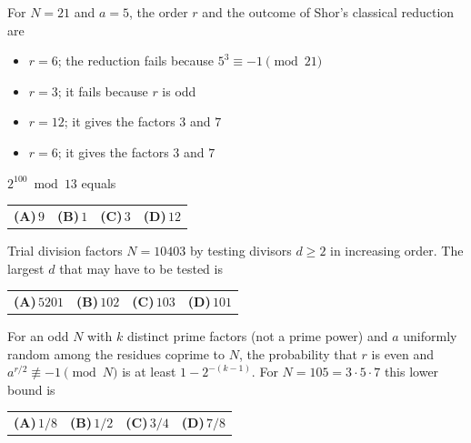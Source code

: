 \documentclass[11pt,a4paper]{article}
\newcommand{\optlabel}[1]{\textbf{(#1)}}
\newenvironment{qitem}[1]{\begin{list}{}{\setlength{\leftmargin}{3.3em}\setlength{\labelwidth}{3.1em}%
  \setlength{\labelsep}{0.2em}\setlength{\topsep}{3pt}\setlength{\parsep}{3pt}}\item[\textbf{Q.#1}\hfill]}{\end{list}}
\newcommand{\qsep}{\par\vspace{2pt}{\color{black!15}\hrule}\vspace{4pt}}
\begin{document}
\begin{qitem}{11}
For $N = 21$ and $a = 5$, the order $r$ and the outcome of Shor's classical reduction are
\begin{itemize}[leftmargin=2.6em, labelsep=0.4em, itemsep=2pt, topsep=3pt]
\item[\optlabel{A}] $r = 6$; the reduction fails because $5^3 \equiv -1 \pmod{21}$
\item[\optlabel{B}] $r = 3$; it fails because $r$ is odd
\item[\optlabel{C}] $r = 12$; it gives the factors $3$ and $7$
\item[\optlabel{D}] $r = 6$; it gives the factors $3$ and $7$
\end{itemize}
\end{qitem}
\qsep

\begin{qitem}{12}
$2^{100} \bmod 13$ equals
\par\smallskip\noindent\begin{tabularx}{\linewidth}{@{}*{4}{L}@{}}
\optlabel{A}\,$9$ & \optlabel{B}\,$1$ & \optlabel{C}\,$3$ & \optlabel{D}\,$12$
\end{tabularx}
\end{qitem}
\qsep

\begin{qitem}{13}
Trial division factors $N = 10403$ by testing divisors $d \ge 2$ in increasing order. The largest $d$ that may have to be tested is
\par\smallskip\noindent\begin{tabularx}{\linewidth}{@{}*{4}{L}@{}}
\optlabel{A}\,$5201$ & \optlabel{B}\,$102$ & \optlabel{C}\,$103$ & \optlabel{D}\,$101$
\end{tabularx}
\end{qitem}
\qsep

\begin{qitem}{14}
For an odd $N$ with $k$ distinct prime factors (not a prime power) and $a$ uniformly random among the residues coprime to $N$, the probability
that $r$ is even and $a^{r/2} \not\equiv -1 \pmod N$ is at least $1 - 2^{-(k-1)}$. For $N = 105 = 3\cdot5\cdot7$ this lower bound is
\par\smallskip\noindent\begin{tabularx}{\linewidth}{@{}*{4}{L}@{}}
\optlabel{A}\,$1/8$ & \optlabel{B}\,$1/2$ & \optlabel{C}\,$3/4$ & \optlabel{D}\,$7/8$
\end{tabularx}
\end{qitem}
\qsep
\end{document}
